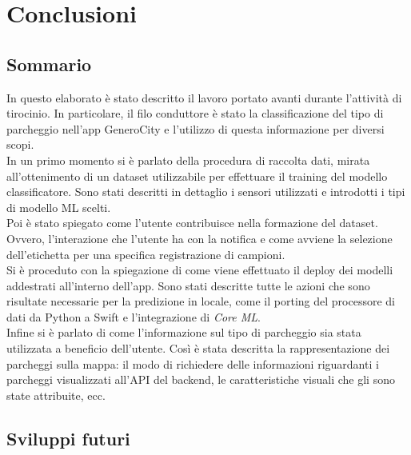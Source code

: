 \chapter{Conclusioni}

\section{Sommario}

In questo elaborato è stato descritto il lavoro portato avanti durante
l'attività di tirocinio. In particolare, il filo conduttore è stato
la classificazione del tipo di parcheggio nell'app GeneroCity 
e l'utilizzo di questa informazione per diversi scopi.\\
In un primo momento si è parlato della procedura di raccolta dati,
mirata all'ottenimento di un dataset utilizzabile per effettuare
il training del modello classificatore. Sono stati descritti in
dettaglio i sensori utilizzati e introdotti i tipi di modello ML
scelti.\\
Poi è stato spiegato come l'utente contribuisce nella formazione del
dataset. Ovvero, l'interazione che l'utente ha con la notifica e 
come avviene la selezione dell'etichetta per una specifica registrazione
di campioni.\\
Si è proceduto con la spiegazione di come viene effettuato il deploy
dei modelli addestrati all'interno dell'app. Sono stati descritte tutte 
le azioni che sono risultate necessarie per la predizione in locale, come
il porting del processore di dati da Python a Swift e l'integrazione di 
\emph{Core ML}.\\
Infine si è parlato di come l'informazione sul tipo di parcheggio sia stata
utilizzata a beneficio dell'utente. Così è stata descritta la 
rappresentazione dei parcheggi sulla mappa: il modo di richiedere delle 
informazioni riguardanti i parcheggi visualizzati all'API del backend, le
caratteristiche visuali che gli sono state attribuite, ecc.

\section{Sviluppi futuri}

